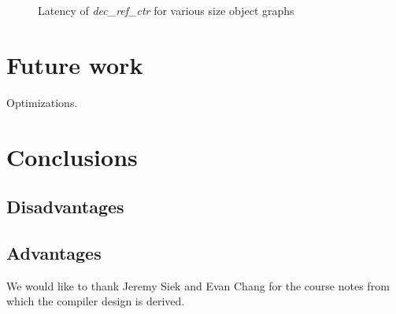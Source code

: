 \documentclass{sigplanconf}
\begin{document}
\begin{figure}
\normalsize %

\caption{Latency of \textit{dec\_ref\_ctr} for various size object graphs}
\label{fig:treelatency}
\end{figure}

\section{Future work}
\label{sec:future}

Optimizations.

\section{Conclusions}
\label{sec:conclusion}

\subsection{Disadvantages}

\subsection{Advantages}


\acks

We would like to thank Jeremy Siek and Evan Chang for the course notes from which the compiler design is derived.




\end{document}
